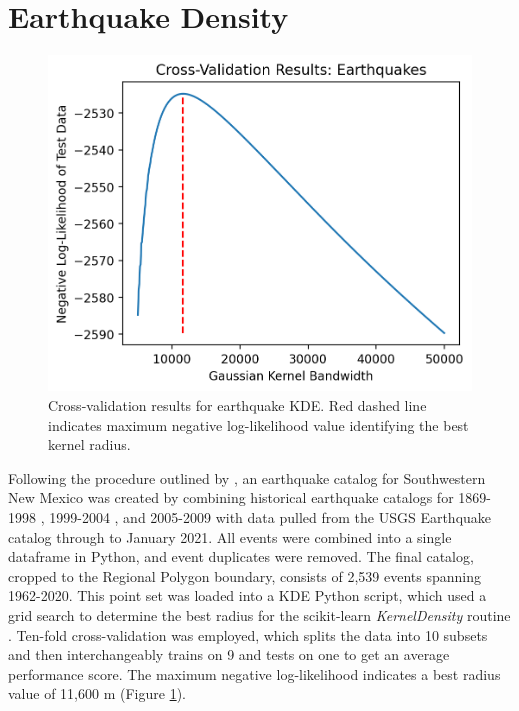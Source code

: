 \section{Earthquake Density}\label{app:dl_eq_density}
\begin{figure}
\centering
\includegraphics[scale=0.6]{templates/images/Figure-Earthquakes_kde_gridsearchcv_result.png}
\singlespacing
\caption[Earthquake density parameter tuning]{Cross-validation results for earthquake KDE. Red dashed line indicates maximum negative log-likelihood value identifying the best kernel radius.}
\label{fig:EQ_cv}
\end{figure}
Following the procedure outlined by \citet{pepin_new_2019}, an earthquake catalog for Southwestern New Mexico was created by combining historical earthquake catalogs for 1869-1998 \citep{sanford_earthquake_2002}, 1999-2004 \citep{sanford_earthquake_2006}, and 2005-2009 \citep{pursley_earthquake_2013} with data pulled from the USGS Earthquake catalog \citep{usgs_earthquake_2021} through to January 2021. All events were combined into a single dataframe in Python, and event duplicates were removed. The final catalog, cropped to the Regional Polygon boundary, consists of 2,539 events spanning 1962-2020. This point set was loaded into a KDE Python script, which used a grid search to determine the best radius for the scikit-learn \textit{KernelDensity} routine \citep{pedregosa_scikit-learn_2011}. Ten-fold cross-validation was employed, which splits the data into 10 subsets and then interchangeably trains on 9 and tests on one to get an average performance score. The maximum negative log-likelihood indicates a best radius value of 11,600 m (Figure \ref{fig:EQ_cv}). 

